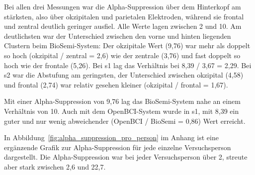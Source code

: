 Bei allen drei Messungen war die Alpha-Suppression über dem Hinterkopf am stärksten, also über okzipitalen und parietalen Elektroden, während sie frontal und zentral deutlich geringer ausfiel. Alle Werte lagen zwischen 2 und 10. Am deutlichsten war der Unterschied zwischen den vorne und hinten liegenden Clustern beim BioSemi-System: Der okzipitale Wert (9,76) war mehr als doppelt so hoch (okzipital / zentral = 2,6) wie der zentrale (3,76) und fast doppelt so hoch wie der frontale (5,26). Bei s1 lag das Verhältnis bei 8,39 / 3,67 = 2,29. Bei s2 war die Abstufung am geringsten, der Unterschied zwischen okzipital (4,58) und frontal (2,74) war relativ gesehen kleiner (okzipital / frontal = 1,67).

Mit einer Alpha-Suppression von 9,76 lag das BioSemi-System nahe an einem Verhältnis von 10. Auch mit dem OpenBCI-System wurde in s1, mit 8,39 ein guter und nur wenig abweichender (OpenBCI / BioSemi = 0,86) Wert erreicht.

In Abbildung~\ref{fig:alpha_suppression_pro_person} im Anhang ist eine ergänzende Grafik zur Alpha-Suppression für jede einzelne Versuchsperson dargestellt. Die Alpha-Suppression war bei jeder Versuchsperson über 2, streute aber stark zwischen 2,6 und 22,7.
